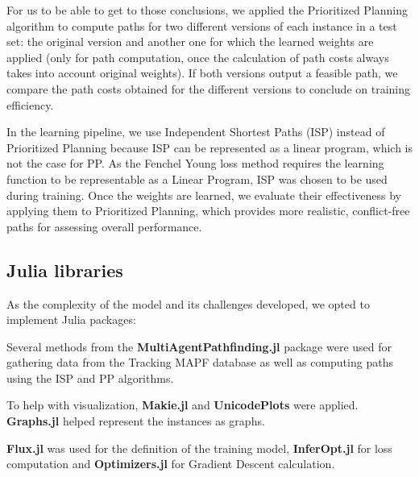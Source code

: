 For us to be able to get to those conclusions, we applied the Prioritized Planning algorithm to compute paths for two different versions of each instance in a test set: the original version and another one for which the learned weights are applied (only for path computation, once the calculation of path costs always takes into account original weights). If both versions output a feasible path, we compare the path costs obtained for the different versions to conclude on training efficiency.

In the learning pipeline, we use Independent Shortest Paths (ISP) instead of Prioritized Planning because ISP can be represented as a linear program, which is not the case for PP. As the Fenchel Young loss method requires the learning function to be representable as a Linear Program, ISP was chosen to be used during training. Once the weights are learned, we evaluate their effectiveness by applying them to Prioritized Planning, which provides more realistic, conflict-free paths for assessing overall performance.

\subsection{Julia libraries}

As the complexity of the model and its challenges developed, we opted to implement Julia packages:

Several methods from the \textbf{MultiAgentPathfinding.jl} \cite{dalleLearningCombinatorialOptimization2022} package were used for gathering data from the Tracking MAPF database as well as computing paths using the ISP and PP algorithms.

To help with visualization, \textbf{Makie.jl} \cite{danischMakiejlFlexibleHighperformance2021} and \textbf{UnicodePlots} \cite{unicodeplotsjl} were applied. \textbf{Graphs.jl} \cite{Graphs2021} helped represent the instances as graphs.

\textbf{Flux.jl} \cite{Flux.jl-2018} was used for the definition of the training model, \textbf{InferOpt.jl} \cite{dalleLearningCombinatorialOptimization2022} for loss computation and \textbf{Optimizers.jl} \cite{optimisersjl} for Gradient Descent calculation.